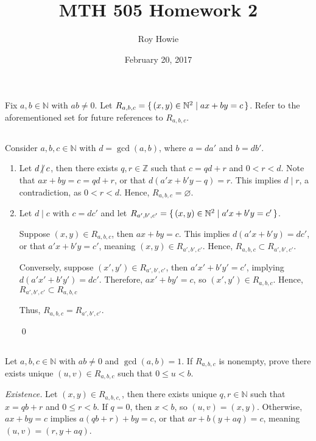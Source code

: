 \documentclass{article}
\newcommand{\N}{\mathbb{N}}
\newcommand{\Z}{\mathbb{Z}}
\begin{document}
\title{MTH 505 Homework 2}
\author{Roy Howie}
\date{February 20, 2017}
\maketitle

Fix $a,b\in\N$ with $ab\ne0$. Let $R_{a,b,c}=\set{(x,y)\in\N^2\mid ax+by=c}$.
Refer to the aforementioned set for future references to $R_{a,b,c}$.

\subsection{} %
  Consider $a,b,c\in\N$ with $d=\gcd(a,b)$, where $a=da'$ and $b=db'$.
  \begin{enumerate}[label=\textbf{(\alph*)}]
    \item{
      Let $d\centernot\mid c$, then there exists $q,r\in\Z$ such that $c=qd+r$
      and $0<r<d$. Note that $ax+by=c=qd+r$, or that $d(a'x+b'y-q)=r$. This
      implies $d\mid r$, a contradiction, as $0<r<d$. Hence, $R_{a,b,c}=
      \varnothing$.
    }
    \item{
      Let $d\mid c$ with $c=dc'$ and let $R_{a',b',c'}=\set{(x,y)\in\N^2\mid
      a'x+b'y=c'}$.

      Suppose $(x,y)\in R_{a,b,c}$, then $ax+by=c$. This implies
      $d(a'x+b'y)=dc'$, or that $a'x+b'y=c'$, meaning $(x,y)\in R_{a',b',c'}$.
      Hence, $R_{a,b,c}\subset R_{a',b',c'}$.

      Conversely, suppose $(x',y')\in R_{a',b',c'}$, then $a'x'+b'y'=c'$,
      implying $d(a'x'+b'y')=dc'$. Therefore, $ax'+by'=c$, so
      $(x',y')\in R_{a,b,c}$. Hence, $R_{a',b',c'}\subset R_{a,b,c}$

      Thus, $R_{a,b,c}=R_{a',b',c'}$.
    }
    \qed
  \end{enumerate}

\subsection{} %
  Let $a,b,c\in\N$ with $ab\ne0$ and $\gcd(a,b)=1$. If $R_{a,b,c}$ is nonempty,
  prove there exists unique $(u,v)\in R_{a,b,c}$ such that $0\leq u<b$.

  \textit{Existence.}
  Let $(x,y)\in R_{a,b,c,}$, then there exists unique $q,r\in\N$ such that
  $x=qb+r$ and $0\leq r<b$. If $q=0$, then $x<b$, so $(u,v)=(x,y)$. Otherwise,
  $ax+by=c$ implies $a(qb+r)+by=c$, or that $ar+b(y+aq)=c$, meaning
  $(u,v)=(r,y+aq)$.
\end{document}
